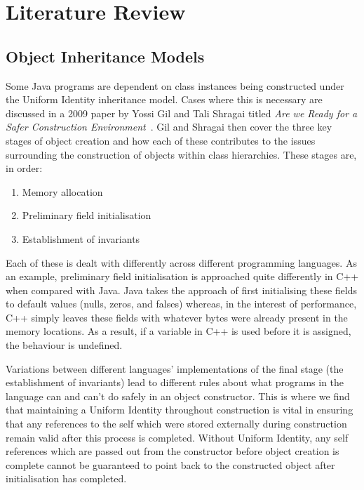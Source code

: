 \chapter{Literature Review}\label{C:us}
\section{Object Inheritance Models}
\label{inheritanceModels}
Some Java programs are dependent on class instances being constructed under the Uniform Identity inheritance model. Cases where this is necessary are discussed in a 2009 paper by Yossi Gil and Tali Shragai titled \textit{Are we Ready for a Safer Construction Environment}~\cite{SaferConstruction}. Gil and Shragai then cover the three key stages of object creation and how each of these contributes to the issues surrounding the construction of objects within class hierarchies. These stages are, in order:
\begin{enumerate}
	\item Memory allocation
	\item Preliminary field initialisation
	\item Establishment of invariants
\end{enumerate}

Each of these is dealt with differently across different programming languages. As an example, preliminary field initialisation is approached quite differently in C++ when compared with Java. Java takes the approach of first initialising these fields to default values (nulls, zeros, and falses) whereas, in the interest of performance, C++ simply leaves these fields with whatever bytes were already present in the memory locations. As a result, if a variable in C++ is used before it is assigned, the behaviour is undefined.
\newline

Variations between different languages’ implementations of the final stage (the establishment of invariants) lead to different rules about what programs in the language can and can't do safely in an object constructor. This is where we find that maintaining a Uniform Identity throughout construction is vital in ensuring that any references to the self which were stored externally during construction remain valid after this process is completed. Without Uniform Identity, any self references which are passed out from the constructor before object creation is complete cannot be guaranteed to point back to the constructed object after initialisation has completed.
\newline


